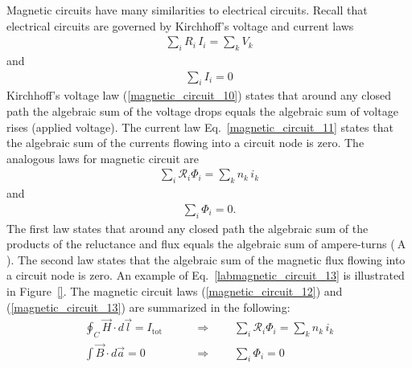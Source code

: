 \documentclass[11pt,a4paper,oneside]{book}
\numberwithin{equation}{section}
\theoremstyle{it}
\theoremstyle{definition}
\begin{document}
Magnetic circuits have many similarities to electrical circuits. Recall that electrical circuits are governed by Kirchhoff's voltage and current laws
\begin{equation}\label{magnetic_circuit_10}
	{\begin{aligned}
			\sum_{i}R_i\,I_i=\sum_{k}V_k
	\end{aligned}}
\end{equation} 
and
\begin{equation}\label{magnetic_circuit_11}
	{\begin{aligned}
			\sum_{i}I_i=0
	\end{aligned}}
\end{equation} 
Kirchhoff's voltage law (\ref{magnetic_circuit_10}) states that around any closed path the algebraic sum of the voltage drops equals the algebraic sum of voltage rises (applied voltage). The current law Eq.~\eqref{magnetic_circuit_11} states that the algebraic sum of the currents flowing into a circuit node is zero. The analogous laws for magnetic circuit are
\begin{equation}\label{magnetic_circuit_12}
	{\begin{aligned}
			\sum_{i}\mathscr{R}_i\Phi_i=\sum_{k}n_k\,i_k
	\end{aligned}}
\end{equation} 
and 
\begin{equation}\label{magnetic_circuit_13}
	{\begin{aligned}
			\sum_{i}\Phi_i=0.
	\end{aligned}}
\end{equation} 
The first law states that around any closed path the algebraic sum of the products of the reluctance and flux equals the algebraic sum of ampere-turns ($\SI{}{\ampere}$). The second law states that the algebraic sum of the magnetic flux flowing into a circuit node is zero. An example of Eq.~\eqref{labmagnetic_circuit_13} is illustrated in Figure~\ref{}. The magnetic circuit laws (\ref{magnetic_circuit_12}) and (\ref{magnetic_circuit_13}) are summarized in the following:
\begin{equation}\label{magnetic_circuit_14}
	\boxed{\begin{aligned}
	\oint_{C}\vec{H}\cdot d\vec{l}=I_\text{tot} \qquad&\Rightarrow\qquad\sum_{i}\mathscr{R}_i\Phi_i=\sum_{k}n_k\,i_k \\[6pt]
	\int\vec{B}\cdot d\vec{a} =0 \qquad&\Rightarrow\qquad\sum_{i}\Phi_i=0
	\end{aligned}}
\end{equation} 
\end{document}
